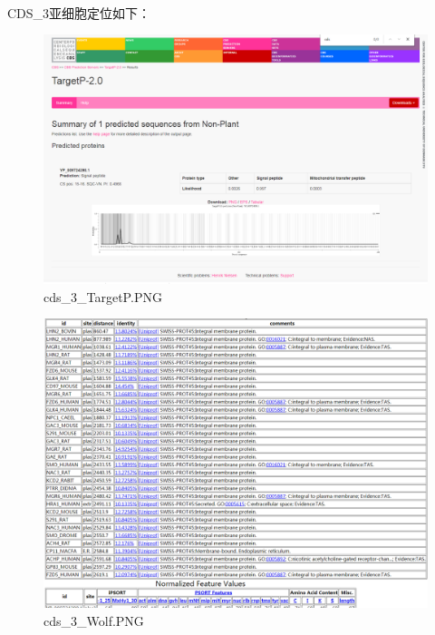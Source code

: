 \documentclass[supercite]{HustGraduPaper}
\begin{document}
	\paragraph{}\label{subpara:subpara}CDS\_3亚细胞定位如下：
	\begin{figure}[H]
		\centering
		\includegraphics[width=1\textwidth]{./material/practice2/cds_3/TargetP.png}
		\caption{cds\_3\_TargetP.PNG}
	\end{figure}
	\begin{figure}[H]
		\centering
		\includegraphics[width=1\textwidth]{./material/practice2/cds_3/wolf.png}
		\caption{cds\_3\_Wolf.PNG}
	\end{figure}
\end{document}
